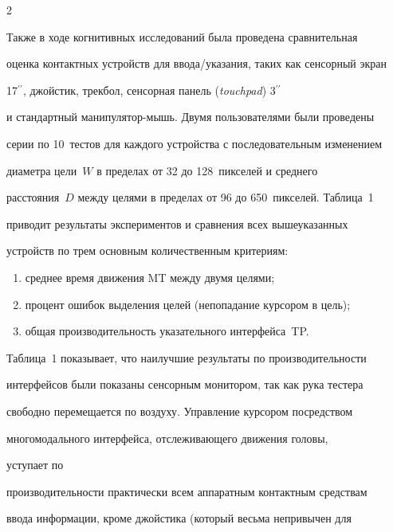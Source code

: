 \begin{multicols}{2}
  


  Также в ходе когнитивных исследований была проведена сравнительная 


оценка контактных устройств для ввода/указания, таких как сенсорный экран 


17$^{\prime\prime}$, джойстик, трекбол, сенсорная панель (\textit{touchpad}) 3$^{\prime\prime}$ 


и  стандартный ма\-ни\-пу\-ля\-тор-мышь. Двумя пользователями были проведены 


серии по 10~тестов для каждого устройства с последовательным изменением 


диаметра цели~$W$ в пределах от 32 до 128~пикселей и среднего 


расстояния~$D$ между целями в пределах от 96 до 650~пикселей. Таблица~1 


приводит результаты экспериментов и сравнения всех вышеуказанных 


устройств по трем основным количественным критериям: 


  \begin{enumerate}[(1)]


\item среднее время движения MT между двумя целями; 


\item процент ошибок выделения целей (непопадание курсором в цель); 


\item общая производительность указательного интерфейса~TP. 


\end{enumerate}








  


  Таблица~1 показывает, что наилучшие резуль\-таты по производительности 


интерфейсов были показа\-ны сенсорным монитором, так как рука тес\-те\-ра 


свободно перемещается по воздуху. Управ\-ление курсором посредством 


многомодального интерфейса, отслеживающего движения головы,\linebreak


 уступает по 


производительности практически всем аппаратным контактным средствам 


ввода информации, кроме джойстика (который весьма непривычен для 



\end{multicols}
